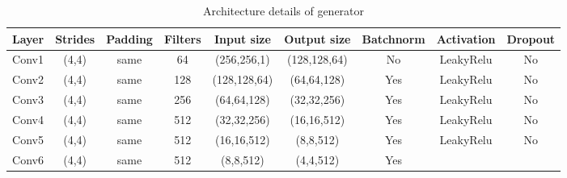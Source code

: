 \documentclass[a4paper,fleqn]{cas-dc}
\begin{document}
\begin{table}[htbp]
\caption{Architecture details of generator}
\begin{tabular}{|c|c|c|c|c|c|c|c|c|}
\hline
{\color[HTML]{000000} \textbf{Layer}} &
  {\color[HTML]{000000} \textbf{Strides}} &
  {\color[HTML]{000000} \textbf{Padding}} &
  {\color[HTML]{000000} \textbf{Filters}} &
  {\color[HTML]{000000} \textbf{Input size}} &
  {\color[HTML]{000000} \textbf{Output size}} &
  {\color[HTML]{000000} \textbf{Batchnorm}} &
  {\color[HTML]{000000} \textbf{Activation}} &
  {\color[HTML]{000000} \textbf{Dropout}} \\ \hline
{\color[HTML]{000000} Conv1} &
  {\color[HTML]{000000} (4,4)} &
  {\color[HTML]{000000} same} &
  {\color[HTML]{000000} 64} &
  {\color[HTML]{000000} (256,256,1)} &
  {\color[HTML]{000000} (128,128,64)} &
  {\color[HTML]{000000} No} &
  {\color[HTML]{000000} LeakyRelu} &
  {\color[HTML]{000000} No} \\ \hline
{\color[HTML]{000000} Conv2} &
  {\color[HTML]{000000} (4,4)} &
  {\color[HTML]{000000} same} &
  {\color[HTML]{000000} 128} &
  {\color[HTML]{000000} (128,128,64)} &
  {\color[HTML]{000000} (64,64,128)} &
  {\color[HTML]{000000} Yes} &
  {\color[HTML]{000000} LeakyRelu} &
  {\color[HTML]{000000} No} \\ \hline
{\color[HTML]{000000} Conv3} &
  {\color[HTML]{000000} (4,4)} &
  {\color[HTML]{000000} same} &
  {\color[HTML]{000000} 256} &
  {\color[HTML]{000000} (64,64,128)} &
  {\color[HTML]{000000} (32,32,256)} &
  {\color[HTML]{000000} Yes} &
  {\color[HTML]{000000} LeakyRelu} &
  {\color[HTML]{000000} No} \\ \hline
{\color[HTML]{000000} Conv4} &
  {\color[HTML]{000000} (4,4)} &
  {\color[HTML]{000000} same} &
  {\color[HTML]{000000} 512} &
  {\color[HTML]{000000} (32,32,256)} &
  {\color[HTML]{000000} (16,16,512)} &
  {\color[HTML]{000000} Yes} &
  {\color[HTML]{000000} LeakyRelu} &
  {\color[HTML]{000000} No} \\ \hline
{\color[HTML]{000000} Conv5} &
  {\color[HTML]{000000} (4,4)} &
  {\color[HTML]{000000} same} &
  {\color[HTML]{000000} 512} &
  {\color[HTML]{000000} (16,16,512)} &
  {\color[HTML]{000000} (8,8,512)} &
  {\color[HTML]{000000} Yes} &
  {\color[HTML]{000000} LeakyRelu} &
  {\color[HTML]{000000} No} \\ \hline
{\color[HTML]{000000} Conv6} &
  {\color[HTML]{000000} (4,4)} &
  {\color[HTML]{000000} same} &
  {\color[HTML]{000000} 512} &
  {\color[HTML]{000000} (8,8,512)} &
  {\color[HTML]{000000} (4,4,512)} &
  {\color[HTML]{000000} Yes} &

\end{tabular}
\end{table}
\end{document}
